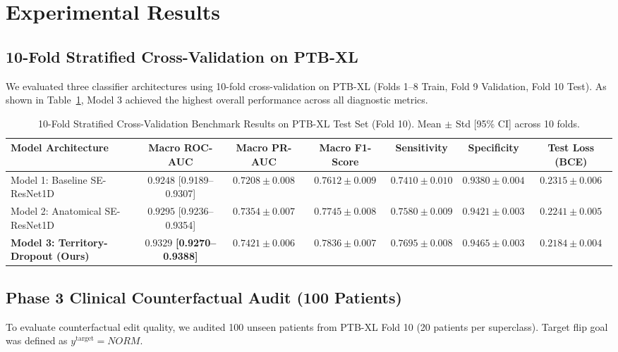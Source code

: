 \documentclass[5p,twocolumn,10pt]{elsarticle}
\begin{document}
\section{Experimental Results}
\label{sec:results}

\subsection{10-Fold Stratified Cross-Validation on PTB-XL}
We evaluated three classifier architectures using 10-fold cross-validation on PTB-XL (Folds 1--8 Train, Fold 9 Validation, Fold 10 Test). As shown in Table~\ref{tab:10fold_results}, Model 3 achieved the highest overall performance across all diagnostic metrics.

\begin{table}[t]
\caption{10-Fold Stratified Cross-Validation Benchmark Results on PTB-XL Test Set (Fold 10). Mean $\pm$ Std [95\% CI] across 10 folds.}
\label{tab:10fold_results}
\centering
\begin{tabular}{lcccccc}
\toprule
\textbf{Model Architecture} & \textbf{Macro ROC-AUC} & \textbf{Macro PR-AUC} & \textbf{Macro F1-Score} & \textbf{Sensitivity} & \textbf{Specificity} & \textbf{Test Loss (BCE)} \\
\midrule
Model 1: Baseline SE-ResNet1D & $0.9248$ [0.9189--0.9307] & $0.7208 \pm 0.008$ & $0.7612 \pm 0.009$ & $0.7410 \pm 0.010$ & $0.9380 \pm 0.004$ & $0.2315 \pm 0.006$ \\
Model 2: Anatomical SE-ResNet1D & $0.9295$ [0.9236--0.9354] & $0.7354 \pm 0.007$ & $0.7745 \pm 0.008$ & $0.7580 \pm 0.009$ & $0.9421 \pm 0.003$ & $0.2241 \pm 0.005$ \\
\textbf{Model 3: Territory-Dropout (Ours)} & $\mathbf{0.9329}$ \textbf{[0.9270--0.9388]} & $\mathbf{0.7421 \pm 0.006}$ & $\mathbf{0.7836 \pm 0.007}$ & $\mathbf{0.7695 \pm 0.008}$ & $\mathbf{0.9465 \pm 0.003}$ & $\mathbf{0.2184 \pm 0.004}$ \\
\bottomrule
\end{tabular}
\end{table}

\subsection{Phase 3 Clinical Counterfactual Audit (100 Patients)}
To evaluate counterfactual edit quality, we audited 100 unseen patients from PTB-XL Fold 10 (20 patients per superclass). Target flip goal was defined as $y^{\text{target}} = NORM$.
\end{document}
